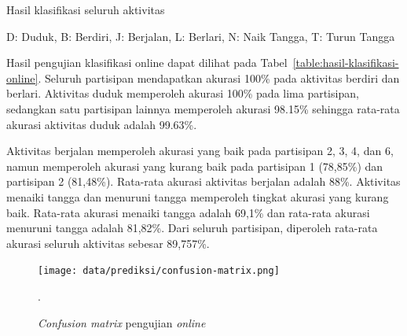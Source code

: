 \begin{table}[h!]
    \centering
    \caption{Hasil klasifikasi seluruh aktivitas}
    \begin{threeparttable}
        \begin{tablenotes}\footnotesize
            \item  D: Duduk, B: Berdiri, J: Berjalan, L: Berlari, N: Naik Tangga, T: Turun Tangga 
        \end{tablenotes}
    \end{threeparttable}
    \label{table:hasil-klasifikasi-online}
\end{table}

Hasil pengujian klasifikasi online dapat dilihat pada Tabel~\ref{table:hasil-klasifikasi-online}. Seluruh partisipan mendapatkan akurasi 100\% pada aktivitas berdiri dan berlari. Aktivitas duduk memperoleh akurasi 100\% pada lima partisipan, sedangkan satu partisipan lainnya memperoleh akurasi 98.15\% sehingga rata-rata akurasi aktivitas duduk adalah 99.63\%.

Aktivitas berjalan memperoleh akurasi yang baik pada partisipan 2, 3, 4, dan 6, namun memperoleh akurasi yang kurang baik pada partisipan 1 (78,85\%) dan partisipan 2 (81,48\%). Rata-rata akurasi aktivitas berjalan adalah 88\%. Aktivitas menaiki tangga dan menuruni tangga memperoleh tingkat akurasi yang kurang baik. Rata-rata akurasi menaiki tangga adalah 69,1\% dan rata-rata akurasi menuruni tangga adalah 81,82\%. Dari seluruh partisipan, diperoleh rata-rata akurasi seluruh aktivitas sebesar 89,757\%.

\begin{figure}[h!]
    \centering
    \texttt{[image: data/prediksi/confusion-matrix.png]}
    \caption{\textit{Confusion matrix} pengujian \textit{online}}.
    \label{gambar:online-confusion-martix}
\end{figure}

